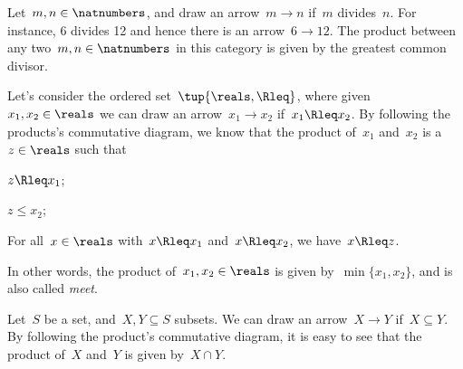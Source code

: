 \begin{example}
  Let~$m,n\in \natnumbers$, and draw an arrow~$m\to n$ if~$m$ divides~$n$. For instance, 6 divides 12 and hence there is an arrow~$6\to 12$. The product between any two~$m,n\in \natnumbers$ in this category is given by the greatest common divisor.
\end{example}

\begin{example}
  Let's consider the ordered set~$\tup{\reals,\Rleq}$, where given~$x_1,x_2\in \reals$ we can draw an arrow~$x_1\to x_2$ if~$x_1\Rleq x_2$. By following the products's commutative diagram, we know that the product of~$x_1$ and~$x_2$ is a~$z\in \reals$ such that
  \begin{compactitem}
    \item $z\Rleq x_1$;
    \item $z\leq x_2$;
    \item For all~$x\in \reals$ with~$x\Rleq x_1$ and~$x\Rleq x_2$, we have~$x\Rleq z$.
  \end{compactitem}
  In other words, the product of~$x_1,x_2\in \reals$ is given by~$\min\{x_1,x_2\}$, and is also called \emph{meet}.
\end{example}

\begin{example}
  \label{ex:subset_prod}
  Let~$S$ be a set, and~$X,Y\subseteq S$ subsets. We can draw an arrow~$X\to Y$ if~$X\subseteq Y$. By following the product's commutative diagram, it is easy to see that the product of~$X$ and~$Y$ is given by~$X\cap Y$.
\end{example}


